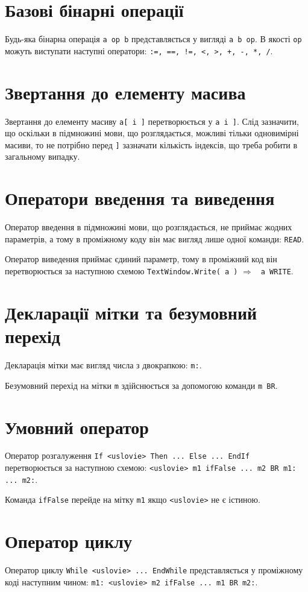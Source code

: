 \documentclass[a4paper,12pt,notitlepage,pdftex]{scrreprt}
\begin{document}
    \section{Базові бінарні операції}
        Будь-яка бінарна операція \verb"a op b" представляється у вигляді \verb"a b op".
        В якості \verb"op" можуть виступати наступні оператори: \verb":=, ==, !=, <, >, +, -, *, /".
    \section{Звертання до елементу масива}
        Звертання до елементу масиву \verb"a[ i ]" перетворюється у \verb"a i ]".
        Слід зазначити, що оскільки в підмножині мови, що розглядається, можливі тільки одновимірні масиви, то не
        потрібно перед \verb"]" зазначати кількість індексів, що треба робити в загальному випадку.
    \section{Оператори введення та виведення}
        Оператор введення в підмножині мови, що розглядається, не приймає жодних параметрів, а тому в проміжному коду
        він має вигляд лише одної команди: \verb"READ".

        Оператор виведення приймає єдиний параметр, тому в проміжний код він перетворюється за наступною схемою
        \verb"TextWindow.Write( a )" $\Rightarrow$ \verb$ a WRITE$.
    \section{Декларації мітки та безумовний перехід}
        Декларація мітки має вигляд числа з двокрапкою: \verb$m:$.

        Безумовний перехід на мітки \verb$m$ здійснюється за допомогою команди \verb$m BR$.
    \section{Умовний оператор}
        Оператор розгалуження \verb$If <uslovie> Then ... Else ... EndIf$ перетворюється за наступною схемою:
        \verb$<uslovie> m1 ifFalse ... m2 BR m1: ... m2:$.

        Команда \verb"ifFalse" перейде на мітку \verb$m1$ якщо \verb$<uslovie>$ не є істиною.
    \section{Оператор циклу}
        Оператор циклу \verb$While <uslovie> ... EndWhile$ представляється у проміжному коді наступним чином:
        \verb$m1: <uslovie> m2 ifFalse ... m1 BR m2:$.
\end{document}
